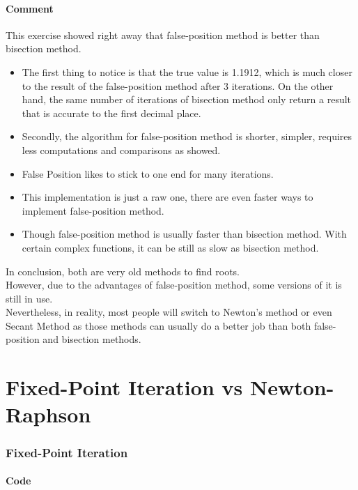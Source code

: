 \documentclass[12pt]{article}
\begin{document}
      \subsection*{Comment}
        This exercise showed right away that false-position method is better than bisection method.\\
        \begin{itemize}
          \item The first thing to notice is that the true value is 1.1912, which is much closer to the result of
          the false-position method after 3 iterations.
          On the other hand, the same number of iterations of bisection method only return a result that is
          accurate to the first decimal place.
          \item Secondly, the algorithm for false-position method is shorter, simpler, requires less computations and
          comparisons as showed.
          \item False Position likes to stick to one end for many iterations.
          \item This implementation is just a raw one, there are even faster ways to implement false-position method.
          \item Though false-position method is usually faster than bisection method.
          With certain complex functions, it can be still as slow as bisection method.
        \end{itemize}
        In conclusion, both are very old methods to find roots.\\
        However, due to the advantages of false-position method, some versions of it is still in use.\\
        Nevertheless, in reality, most people will switch to Newton's method or even Secant Method as those methods
        can usually do a better job than both false-position and bisection methods.
  \part{Fixed-Point Iteration vs Newton-Raphson}
    \section*{Fixed-Point Iteration}
      \subsection*{Code}
\end{document}
